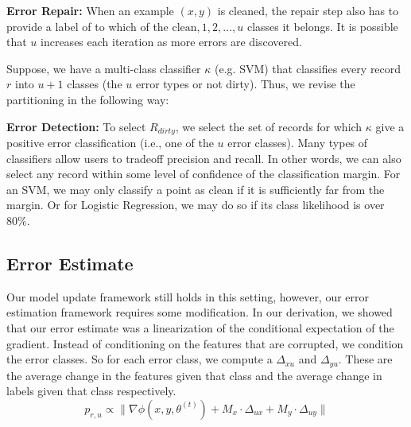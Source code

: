 \noindent\textbf{Error Repair: } When an example $(x,y)$ is cleaned, the repair step also has to provide a label of to which of the ${\text{clean}, 1,2,...,u}$ classes it belongs. It is possible that $u$ increases each iteration as more errors are discovered. 

\vspace{0.5em}

Suppose, we have a multi-class classifier $\kappa$ (e.g. SVM) that classifies every record $r$ into $u+1$ classes (the $u$ error types or not dirty).
Thus, we revise the partitioning in the following way:

\vspace{0.5em}

\noindent\textbf{Error Detection: } To select $R_{dirty}$, we select the set of records for which $\kappa$ give a positive error classification (i.e., one of the $u$ error classes).
Many types of classifiers allow users to tradeoff precision and recall.
In other words, we can also select any record within some level of confidence of the classification margin.
For an SVM, we may only classify a point as clean if it is sufficiently far from the margin.
Or for Logistic Regression, we may do so if its class likelihood is over 80\%.

\subsection{Error Estimate}
Our model update framework still holds in this setting, however, our error estimation framework requires some modification.
In our derivation, we showed that our error estimate was a linearization of the conditional expectation of the gradient.
Instead of conditioning on the features that are corrupted, we condition the error classes.
So for each error class, we compute a $\Delta_{xu}$ and $\Delta_{yu}$.
These are the average change in the features given that class and the average change in labels given that class respectively.
\[
p_{r,u}\propto\|\nabla\phi(x,y,\theta^{(t)}) + M_x \cdot \Delta_{ux} +  M_y \cdot \Delta_{uy}\|
\] 

